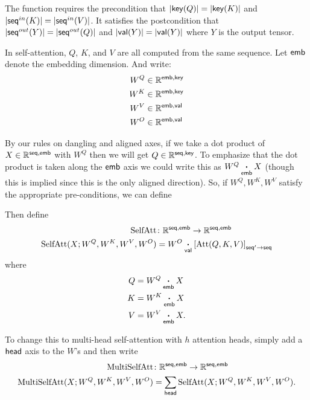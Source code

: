 \documentclass{article}
\begin{document}
The function requires the precondition that $|\name{key}(Q)|=|\name{key}(K)|$ and $|\name{seq}^{in}(K)|=|\name{seq}^{in}(V)|$.
It satisfies the  postcondition that $|\name{seq}^{out}(Y)|=|\name{seq}^{out}(Q)|$ and $|\name{val}(Y)|=|\name{val}(Y)|$ where $Y$ is the output tensor.






In self-attention, $Q$, $K$, and $V$ are all computed from the same sequence.  
Let $\name{emb}$ denote the embedding dimension.
And write:
\begin{align*}
  W^Q &\in \mathbb{R}^{\name{emb}, \name{key}} \\
  W^K &\in \mathbb{R}^{\name{emb}, \name{key}} \\
  W^V &\in \mathbb{R}^{\name{emb}, \name{val}} \\
  W^O &\in \mathbb{R}^{\name{emb}, \name{val}}
\end{align*}

By our rules on dangling and aligned axes, if we take a dot product of $X \in \mathbb{R}^{\name{seq},\name{emb}}$ with $W^Q$ then we will get 
$Q \in \mathbb{R}^{\name{seq},\name{key}}$. 
To emphasize that the dot product is taken along the $\name{emb}$ axis  we could write this as $W^Q \ndot{emb} X$ (though this is implied since this is the only aligned direction).
So, if $W^Q,W^K,W^V$ satisfy the appropriate pre-conditions, we can define 


Then define
\begin{align*}
  \text{SelfAtt} &\colon \mathbb{R}^{\name{seq},\name{emb}} \rightarrow \mathbb{R}^{\name{seq},\name{emb}} \\
  \text{SelfAtt}(X; W^Q, W^K, W^V, W^O) &= W^O \ndot{val} \nmov{seq'}{seq}{\text{Att}(Q, K, V)}
\end{align*}
where
\begin{align*}
  Q &= W^Q \ndot{emb} X \\
  K &= W^K \ndot{emb} X \\
  V &= W^V \ndot{emb} X.
\end{align*}

To change this to multi-head self-attention with $h$ attention heads, simply add a $\name{head}$ axis to the $W$'s and then write 
\begin{align*}
\text{MultiSelfAtt} &\colon \mathbb{R}^{\name{seq},\name{emb}} \rightarrow \mathbb{R}^{\name{seq},\name{emb}} \\
\text{MultiSelfAtt}(X; W^Q, W^K, W^V, W^O) &= \nsum{head} \text{SelfAtt}(X; W^Q, W^K, W^V, W^O).
\end{align*}
\end{document}
